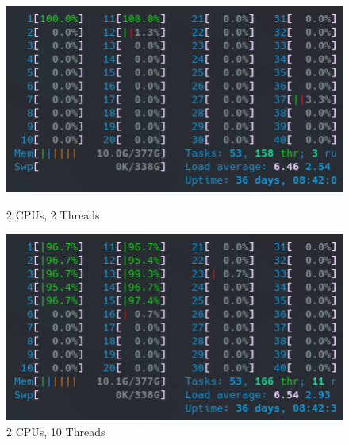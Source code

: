 \begin{figure}[!h]
    \centering
    \captionsetup{width=.48\linewidth}
    \begin{minipage}[t]{0.48\textwidth}
        \includegraphics[width=\textwidth]{figures/configurations/OMP/htop_cpus/2CPUs_2Threads.png}
        \caption{2 CPUs, 2 Threads}\label{fig:2CPUs_2Threads}
    \end{minipage}
    \hspace{0.4cm}
    \centering
    \captionsetup{width=.48\linewidth}
    \begin{minipage}[t]{0.48\textwidth}
        \includegraphics[width=\textwidth]{figures/configurations/OMP/htop_cpus/2CPUs_10Threads.png}
        \caption{2 CPUs, 10 Threads}\label{fig:2CPUs_10Threads}
    \end{minipage}


\end{figure}
